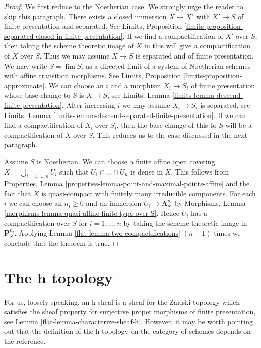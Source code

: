 \begin{proof}

We first reduce to the Noetherian case. We strongly urge the reader
to skip this paragraph. There exists a closed immersion
$X \to X'$ with $X' \to S$ of finite presentation and separated.
See Limits, Proposition
\ref{limits-proposition-separated-closed-in-finite-presentation}.
If we find a compactification of $X'$ over $S$, then
taking the scheme theoretic image of $X$ in this will give
a compactification of $X$ over $S$. Thus we may assume
$X \to S$ is separated and of finite presentation.
We may write $S = \lim S_i$ as a directed
limit of a system of Noetherian schemes with affine transition morphisms.
See Limits, Proposition \ref{limits-proposition-approximate}.
We can choose an $i$ and a morphism $X_i \to S_i$ of finite
presentation whose base change to $S$ is $X \to S$, see
Limits, Lemma \ref{limits-lemma-descend-finite-presentation}.
After increasing $i$ we may assume $X_i \to S_i$ is separated, see
Limits, Lemma \ref{limits-lemma-descend-separated-finite-presentation}.
If we can find a compactification of $X_i$ over $S_i$, then the
base change of this to $S$ will be a compactification of $X$ over $S$.
This reduces us to the case discussed in the next paragraph.

\medskip\noindent
Assume $S$ is Noetherian. We can choose a finite affine open covering
$X = \bigcup_{i = 1, \ldots, n} U_i$ such that $U_1 \cap \ldots \cap U_n$
is dense in $X$. This follows from
Properties, Lemma \ref{properties-lemma-point-and-maximal-points-affine}
and the fact that $X$ is quasi-compact with finitely many
irreducible components. For each $i$ we can choose an $n_i \geq 0$ and an
immersion $U_i \to \mathbf{A}^{n_i}_S$ by
Morphisms, Lemma \ref{morphisms-lemma-quasi-affine-finite-type-over-S}.
Hence $U_i$ has a compactification over $S$ for $i = 1, \ldots, n$
by taking the scheme theoretic image in $\mathbf{P}^{n_i}_S$.
Applying Lemma \ref{flat-lemma-two-compactifications}
$(n - 1)$ times we conclude that the theorem is true.
\end{proof}

\section{The h topology}
\label{flat-section-h}
For us, loosely speaking, an h sheaf is a sheaf for the Zariski topology
which satisfies the sheaf property for surjective proper morphisms
of finite presentation, see Lemma \ref{flat-lemma-characterize-sheaf-h}.
However, it may be worth pointing out that the definition of the h topology
on the category of schemes depends on the reference.


